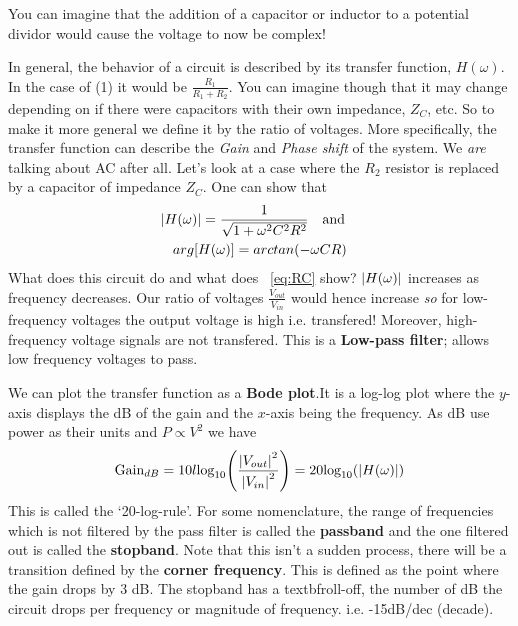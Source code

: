 You can imagine that the addition of a capacitor or inductor to a potential dividor would cause the voltage to now be complex!\par
In general, the behavior of a circuit is described by its transfer function, $H(\omega)$. In the case of (1) it would be $\frac{R_{1}}{R_{1} + R_{2}}$. You can imagine though that it may change depending on if there were capacitors with their own impedance, $Z_{C}$, etc. So to make it more general we define it by the ratio of voltages. More specifically, the transfer function can describe the \textit{Gain} and \textit{Phase shift} of the system. We \textit{are} talking about AC after all.  Let's look at a case where the $R_{2}$ resistor is replaced by a capacitor of impedance $Z_{C}$. One can show that 
\begin{equation} \label{eq:RC}
\begin{gathered}
\abs{H(\omega)} = \frac{1}{\sqrt{1+\omega^{2}C^{2}R^{2}}}\quad \textrm{and}\quad  \\ arg[H(\omega)] = arctan(-\omega CR)
\end{gathered}
\end{equation}
What does this circuit do and what does ~\ref{eq:RC} show? $\abs{H(\omega)}$ increases as frequency decreases. Our ratio of voltages $\frac{V_{out}}{V_{in}}$ would hence increase \textit{so} for low-frequency voltages the output voltage is high i.e. transfered! Moreover, high-frequency voltage signals are not transfered. This is a \textbf{Low-pass filter}; allows low frequency voltages to pass. \par We can plot the transfer function as a \textbf{Bode plot}.It is a log-log plot where the $y$-axis displays the dB of the gain and the $x$-axis being the frequency. As dB use power as their units and $ P \propto V^{2}$ we have
\begin{equation}
\begin{gathered}
\textrm{Gain}_{dB} = 10l\textrm{log}_{10}\Bigg(\frac{\abs{V_{out}}^{2}}{\abs{V_{in}}^{2}}\Bigg) = 20\textrm{log}_{10}(\abs{H(\omega)})
\end{gathered}
\end{equation}
This is called the `20-log-rule'. For some nomenclature, the range of frequencies which is not filtered by the pass filter is called the \textbf{passband} and the one filtered out is called the \textbf{stopband}. Note that this isn't a sudden process, there will be a transition defined by the \textbf{corner frequency}. This is defined as the point where the gain drops by 3 dB. The stopband has a textbf{roll-off}, the number of dB the circuit drops per frequency or magnitude of frequency. i.e. -15dB/dec (decade).
